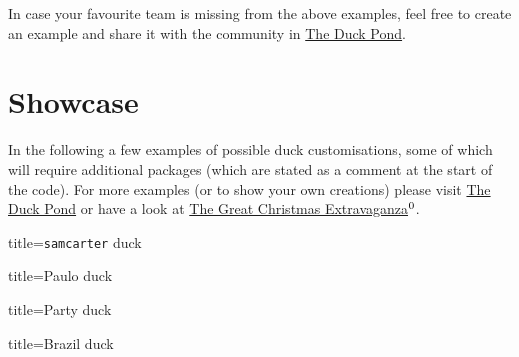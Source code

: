 \documentclass[parskip=half]{scrartcl}
\begin{document}
In case your favourite team is missing from the above examples, feel free to create an example and share it with the community in \href{https://tex.stackexchange.com/q/387047/36296}{The Duck Pond}. 

\clearpage
\section{Showcase}

\addtocounter{footnote}{1}
In the following a few examples of possible duck customisations, some of which will require additional packages (which are stated as a comment at the start of the code). For more examples (or to show your own creations) please visit \href{https://tex.stackexchange.com/q/387047/36296}{The Duck Pond} or have a look at \href{https://vimeo.com/246256860}{The Great Christmas Extravaganza}$^\thefootnote$.

\begin{tcblisting}{title={\texttt{samcarter} duck}}
\begin{tikzpicture}
	\duck[body=yellow!50!brown!50!white, 
		longhair=red!50!brown, 
		jacket=blue!50!black]
\end{tikzpicture}
\end{tcblisting}

\begin{tcblisting}{title={Paulo duck}}
\end{tcblisting}

\begin{tcblisting}{title={Party duck}}
\begin{tikzpicture}
  \duck[cake=violet,
  			magichat=violet,
  			magicstars=white!85!yellow]
\end{tikzpicture}	
\end{tcblisting}

\begin{tcblisting}{title={Brazil duck}}
\end{tcblisting}
\end{document}
